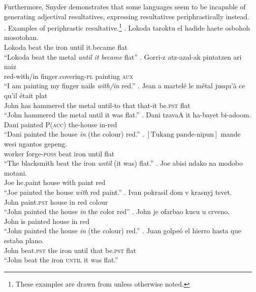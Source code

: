 \documentclass[MilwayThesis]{subfiles}
\begin{document}
Furthermore, Snyder demonstrates that some languages seem to be incapable of generating adjectival resultatives, expressing resultatives periphrastically instead.
\ex. Examples of periphrastic resultative.\footnote{These examples are drawn from \textcite{snyder2001nature} unless otherwise noted.}
\ag. Lokoda taroktu el hadide haete\textglotstop{} osbohoh mosoto\textglotstop{}han.\\
Lokoda beat the iron until it.became flat\\
``Lokoda beat the metal \textit{until it became} flat''
\bg. Gorri-z atz-azal-ak pintatzen ari naiz\\
red-with/in finger.covering-\textsc{pl} painting \textsc{aux}\\
``I am painting my finger nails \textit{with/in} red.''
\bg. Jean a martel\'{e} le m\'{e}tal jusqu'\`{a} ce qu'il \'{e}tait plat\\
John has hammered the metal until-to that that-it be.\textsc{pst} flat\\
``John hammered the metal until it was flat.''
\bg. Dani tzavaA \textglotstop{}it ha-bayet bi-\textglotstop{}adoom.\\
Dani painted P(\textsc{acc}) the-house in-red\\
``Dani painted the house \textit{in} (the colour) red.''
\bg. $\left[\text{Tukang pande-nipun}\right]$ mande wesi ngantos gepeng.\\
{worker forge-\textsc{poss}} beat iron until flat\\
``The blacksmith beat the iron \textit{until} (it was) flat.''
\bg. Joe abisi ndako na modobo motani.\\
Joe he.paint house with paint red\\
``Joe painted the house \textit{with} red paint.''
\bg. Ivan pokrasil dom v krasnyj tsvet.\\
John paint.\textsc{pst} house in red colour\\
``John painted the house \textit{in} the color red''
\bg. John je ofarbao kucu u crveno.\\
John is painted house in red\\
``John painted the house \textit{in} (the colour) red.''
\bg. Juan golpe\'{o} el hierro hasta que estaba plano.\\
John beat.\textsc{pst} the iron until that be.\textsc{pst} flat\\
``John beat the iron \textsc{until} it was flat.''
\end{document}
